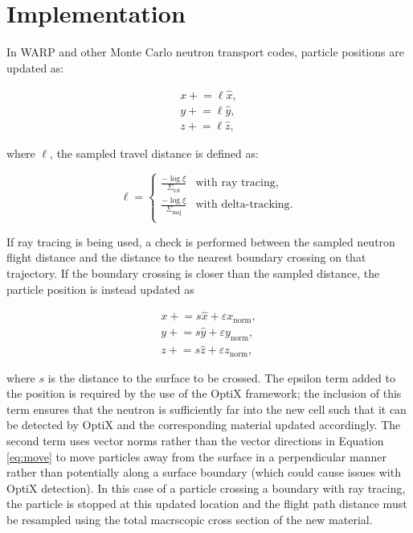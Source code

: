 \section{Implementation}

In WARP and other Monte Carlo neutron transport codes, particle positions are updated as:

\begin{gather}
\label{eq:move}
x \mathrel{+}= \ell\hat{x}, \nonumber\\
y \mathrel{+}= \ell\hat{y}, \\
z \mathrel{+}= \ell\hat{z}, \nonumber
\end{gather}

\noindent where $\ell$, the sampled travel distance is defined as:

\begin{equation}
\ell = 
	\begin{cases}
	\frac{-\log\xi}{\Sigma_{\mathrm{tot}}} & \text{with ray tracing}, \\
	\frac{-\log\xi}{\Sigma_{\mathrm{maj}}} & \text{with delta-tracking}. \\
	\end{cases}
\end{equation}

If ray tracing is being used, a check is performed between the sampled neutron flight distance and the
distance to the nearest boundary crossing on that trajectory. If the boundary crossing is closer than the
sampled distance, the particle position is instead updated as

\begin{gather}
x \mathrel{+}= s\hat{x} + \varepsilon x_{\mathrm{norm}}, \nonumber\\
y \mathrel{+}= s\hat{y} + \varepsilon y_{\mathrm{norm}}, \\
z \mathrel{+}= s\hat{z} + \varepsilon z_{\mathrm{norm}}, \nonumber
\end{gather}

\noindent where $s$ is the distance to the surface to be crossed. The epsilon term added to the position 
is required
by the use of the OptiX framework; the inclusion of this term ensures that the neutron is sufficiently far
 into the new cell such that it can be detected by OptiX and the corresponding material updated
accordingly. The second term uses vector norms rather than the vector directions in Equation \ref{eq:move}
to move particles away from the surface in a perpendicular manner rather than potentially along a surface
boundary (which could cause issues with OptiX detection). In this case of a particle crossing a boundary
with ray tracing, the particle is stopped at this updated location and the flight path distance must be
resampled using the total macrscopic cross section of the new material.

